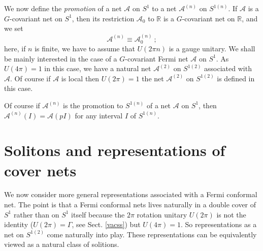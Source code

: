 \documentclass[11pt]{article}
\def\setminus{\smallsetminus}
\def\A{{\cal A}}
\def\I{{\cal I}}
\def\H{{\cal H}}
\def\S{{\cal S}}
\def\Sn{S^{1(n)}}
\def\S2{S^{1(2)}}
\def\setminus{\smallsetminus}
\def\A{{\mathcal A}}
\def\H{{\mathcal H}}
\def\I{{\mathcal I}}
\begin{document}
We now define the \emph{promotion} of a net $\A$ on $S^1$ to a net $\A^{(n)}$ on $\Sn$. If $\A$ is a $G$-covariant net on $S^1$, then its restriction $\A_0$ to $\mathbb R$ is a $G$-covariant net on $\mathbb R$, and we set
\[
\A^{(n)}\equiv \A_0^{(n)}\ ;
\]
here, if $n$ is finite, we have to assume that $U(2\pi n)$ is a gauge unitary.
We shall be mainly interested in the case of a $G$-covariant Fermi net $\A$ on $S^1$. As $U(4\pi)=1$ in this case, we have a natural net $\A^{(2)}$ on $\S2$ associated with $\A$. Of course if $\A$ is local then $U(2\pi) =1$ the net $\A^{(2)}$ on $\S2$ is defined in this case. 

Of course if $\A^{(n)}$  is the promotion to $\Sn$ of a net $\A$ on $S^1$, then  $\A^{(n)}(I)=\A(pI)$ for any interval $I$ of $\Sn$.
%


%
\section{Solitons and representations of cover nets}
%
We now consider more general representations associated with a Fermi conformal net. The point is that a Fermi conformal nets lives naturally in a double cover of $S^1$ rather than on $S^1$ itself  because the $2\pi$ rotation unitary $U(2\pi)$ is not the identity ($U(2\pi)=\Gamma$, see Sect. \ref{vacss}) but $U(4\pi)=1$. So representations as a net on $\S2$ come naturally into play. These representations can be equivalently viewed as a natural class of solitions.
%
\end{document}
